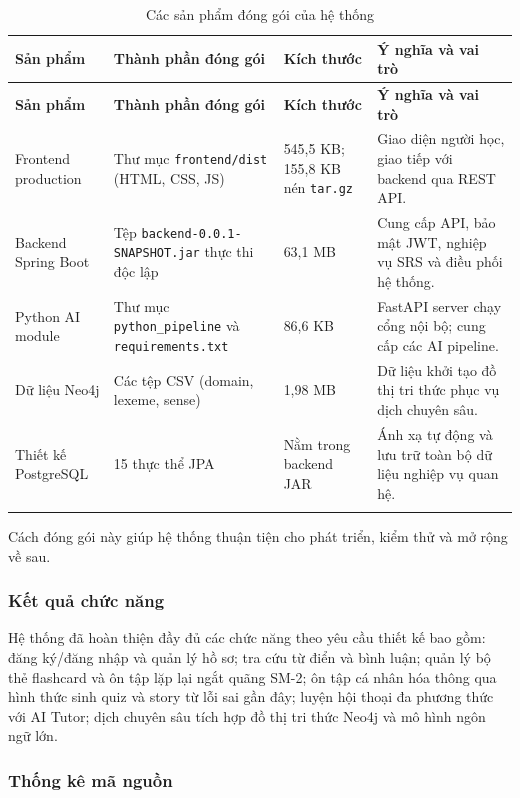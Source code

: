 \documentclass[../DoAn.tex]{subfiles}
\begin{document}
\begin{longtable}{|p{3.0cm}|p{4cm}|p{2.0cm}|p{4cm}|}
\hline
\textbf{Sản phẩm} & \textbf{Thành phần đóng gói} & \textbf{Kích thước} & \textbf{Ý nghĩa và vai trò} \\
\hline
\endfirsthead
\hline
\textbf{Sản phẩm} & \textbf{Thành phần đóng gói} & \textbf{Kích thước} & \textbf{Ý nghĩa và vai trò} \\
\hline
\endhead
Frontend production & Thư mục \texttt{frontend/dist} (HTML, CSS, JS) & 545,5 KB; 155,8 KB nén \texttt{tar.gz} & Giao diện người học, giao tiếp với backend qua REST API. \\
\hline
Backend Spring Boot & Tệp \texttt{backend-0.0.1-SNAPSHOT.jar} thực thi độc lập & 63,1 MB & Cung cấp API, bảo mật JWT, nghiệp vụ SRS và điều phối hệ thống. \\
\hline
Python AI module & Thư mục \texttt{python\_pipeline} và \texttt{requirements.txt} & 86,6 KB & FastAPI server chạy cổng nội bộ; cung cấp các AI pipeline. \\
\hline
Dữ liệu Neo4j & Các tệp CSV (domain, lexeme, sense) & 1,98 MB & Dữ liệu khởi tạo đồ thị tri thức phục vụ dịch chuyên sâu. \\
\hline
Thiết kế PostgreSQL & 15 thực thể JPA & Nằm trong backend JAR & Ánh xạ tự động và lưu trữ toàn bộ dữ liệu nghiệp vụ quan hệ. \\
\hline
\caption{Các sản phẩm đóng gói của hệ thống}
\label{table:4.11}\\
\end{longtable}

Cách đóng gói này giúp hệ thống thuận tiện cho phát triển, kiểm thử và mở rộng về sau.

\subsubsection{Kết quả chức năng}

Hệ thống đã hoàn thiện đầy đủ các chức năng theo yêu cầu thiết kế bao gồm: đăng ký/đăng nhập và quản lý hồ sơ; tra cứu từ điển và bình luận; quản lý bộ thẻ flashcard và ôn tập lặp lại ngắt quãng SM-2; ôn tập cá nhân hóa thông qua hình thức sinh quiz và story từ lỗi sai gần đây; luyện hội thoại đa phương thức với AI Tutor; dịch chuyên sâu tích hợp đồ thị tri thức Neo4j và mô hình ngôn ngữ lớn.

\subsubsection{Thống kê mã nguồn}
\end{document}
